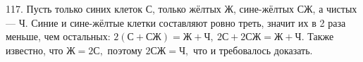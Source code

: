 117. Пусть только синих клеток С, только жёлтых Ж, сине-жёлтых СЖ, а чистых --- Ч. Синие и сине-жёлтые клетки составляют ровно треть, значит их в 2 раза меньше, чем остальных: $2(\text{С}+\text{СЖ})=\text{Ж}+\text{Ч},\ 2\text{С}+2\text{СЖ}=\text{Ж}+\text{Ч}.$ Также известно, что $\text{Ж}=2\text{С},$ поэтому $2\text{СЖ}=\text{Ч},$ что и требовалось доказать.\\
